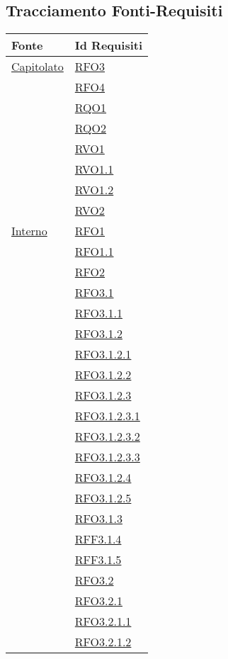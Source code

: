 \subsection{Tracciamento Fonti-Requisiti}
\normalsize
\begin{longtable}{|>{\centering}m{5cm}|m{5cm}<{\centering}|}
\hline
\textbf{Fonte} & \textbf{Id Requisiti}\\
\hline
\endhead
\hyperlink{Capitolato}{Capitolato} & \hyperlink{RFO3}{RFO3}\\
& \hyperlink{RFO4}{RFO4}\\
& \hyperlink{RQO1}{RQO1}\\
& \hyperlink{RQO2}{RQO2}\\
& \hyperlink{RVO1}{RVO1}\\
& \hyperlink{RVO1.1}{RVO1.1}\\
& \hyperlink{RVO1.2}{RVO1.2}\\
& \hyperlink{RVO2}{RVO2}\\ \hline
\hyperlink{Interno}{Interno} & \hyperlink{RFO1}{RFO1}\\
& \hyperlink{RFO1.1}{RFO1.1}\\
& \hyperlink{RFO2}{RFO2}\\
& \hyperlink{RFO3.1}{RFO3.1}\\
& \hyperlink{RFO3.1.1}{RFO3.1.1}\\
& \hyperlink{RFO3.1.2}{RFO3.1.2}\\
& \hyperlink{RFO3.1.2.1}{RFO3.1.2.1}\\
& \hyperlink{RFO3.1.2.2}{RFO3.1.2.2}\\
& \hyperlink{RFO3.1.2.3}{RFO3.1.2.3}\\
& \hyperlink{RFO3.1.2.3.1}{RFO3.1.2.3.1}\\
& \hyperlink{RFO3.1.2.3.2}{RFO3.1.2.3.2}\\
& \hyperlink{RFO3.1.2.3.3}{RFO3.1.2.3.3}\\
& \hyperlink{RFO3.1.2.4}{RFO3.1.2.4}\\
& \hyperlink{RFO3.1.2.5}{RFO3.1.2.5}\\
& \hyperlink{RFO3.1.3}{RFO3.1.3}\\
& \hyperlink{RFF3.1.4}{RFF3.1.4}\\
& \hyperlink{RFF3.1.5}{RFF3.1.5}\\
& \hyperlink{RFO3.2}{RFO3.2}\\
& \hyperlink{RFO3.2.1}{RFO3.2.1}\\
& \hyperlink{RFO3.2.1.1}{RFO3.2.1.1}\\
& \hyperlink{RFO3.2.1.2}{RFO3.2.1.2}\\

\end{longtable}
